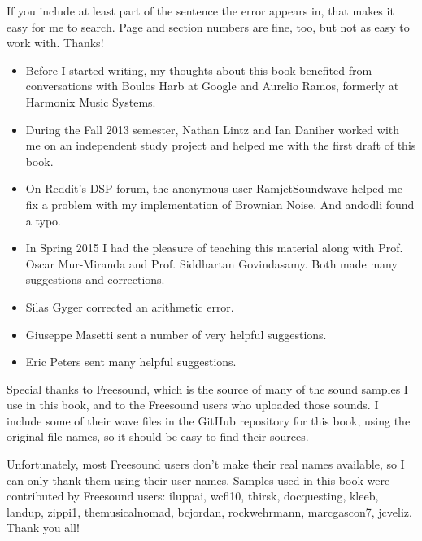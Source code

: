 \documentclass[12pt]{book}
\begin{document}
If you include at least part of the sentence the
error appears in, that makes it easy for me to search.  Page and
section numbers are fine, too, but not as easy to work with.
Thanks!

\small

\begin{itemize}

\item Before I started writing, my thoughts about this book
benefited from conversations with Boulos Harb at Google and
Aurelio Ramos, formerly at Harmonix Music Systems.

\item During the Fall 2013 semester, Nathan Lintz and Ian Daniher
worked with me on an independent study project and helped me with
the first draft of this book.

\item On Reddit's DSP forum, the anonymous user RamjetSoundwave
helped me fix a problem with my implementation of Brownian Noise.
And andodli found a typo.

\item In Spring 2015 I had the pleasure of teaching this material
along with Prof. Oscar Mur-Miranda and Prof. Siddhartan Govindasamy.
Both made many suggestions and corrections.

\item Silas Gyger corrected an arithmetic error.

\item Giuseppe Masetti sent a number of very helpful suggestions.

\item Eric Peters sent many helpful suggestions.


\end{itemize}


Special thanks to Freesound, which is the source of many of the
sound samples I use in this book, and to the Freesound users who
uploaded those sounds.  I include some of their wave files in
the GitHub repository for this book, using the original file
names, so it should be easy to find their sources.

Unfortunately, most Freesound users don't make their real names
available, so I can only thank them using their user names.  Samples
used in this book were contributed by Freesound users: iluppai,
wcfl10, thirsk, docquesting, kleeb, landup, zippi1, themusicalnomad,
bcjordan, rockwehrmann, marcgascon7, jcveliz.  Thank you all!
\end{document}
